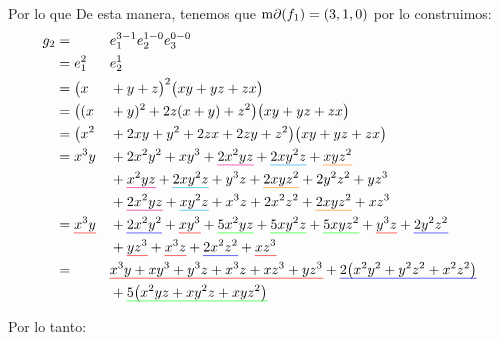 \begin{solucion}
    Por lo que
De esta manera, tenemos que $\operatorname{m\partial}(f_{1})=(3,1,0)$ por lo construimos:
\begin{alignat*}{2}
    g_2 &=&&e_1^{3-1}e_2^{1-0}e_3^{0-0}\\
        &=e_1^{2}&&e_2^1\\
        &=\bigl(x&&+y+z\bigr)^2\bigl(xy +yz+zx\bigr)\\
        &=\bigl((x&&+y)^2 + 2z(x+y) + z^2\bigr)\bigl(xy +yz+zx\bigr)\\
        &=\bigl(x^2 &&+ 2xy + y^2 + 2zx + 2zy + z^2\bigr)\bigl(xy +yz+zx\bigr)\\
        &=x^{3}y
          &&+2x^{2}y^{2}
          +xy^{3}
          +\text{\setulcolor{magenta}\ul{$2x^{2}yz$}}
          +\text{\setulcolor{cyan}\ul{$2xy^{2}z$}}
          +\text{\setulcolor{orange}\ul{$xyz^{2}$}}\\
            & &&
          +\text{\setulcolor{magenta}\ul{$x^{2}yz$}}
          +\text{\setulcolor{cyan}\ul{$2xy^{2}z$}}
          +y^{3}z
          +\text{\setulcolor{orange}\ul{$2xyz^{2}$}}
          +2y^{2}z^{2}
          +yz^{3}\\
            & &&
          +\text{\setulcolor{magenta}\ul{$2x^{2}yz$}}
          +\text{\setulcolor{cyan}\ul{$xy^{2}z$}}
          +x^{3}z
          +2x^{2}z^{2}
          +\text{\setulcolor{orange}\ul{$2xyz^{2}$}}
          +xz^{3}\\
        &=
          \text{\setulcolor{red}\ul{$x^{3}y$}}
          &&+\text{\setulcolor{blue}\ul{$2x^{2}y^{2}$}}
          +\text{\setulcolor{red}\ul{$xy^{3}$}}
          +\text{\setulcolor{green}\ul{$5x^{2}yz$}}
          +\text{\setulcolor{green}\ul{$5xy^{2}z$}}
          +\text{\setulcolor{green}\ul{$5xyz^{2}$}}
          +\text{\setulcolor{red}\ul{$y^{3}z$}}
          +\text{\setulcolor{blue}\ul{$2y^{2}z^{2}$}}\\
          & &&+\text{\setulcolor{red}\ul{$yz^{3}$}}
          +\text{\setulcolor{red}\ul{$x^3z$}}
          +\text{\setulcolor{blue}\ul{$2x^2z^2$}}
          +\text{\setulcolor{red}\ul{$xz^{3}$}}\\
        &=&&\text{\setulcolor{red}\ul{$x^{3}y+ xy^{3} + y^{3}z + x^{3}z + xz^{3} + yz^{3}$}}
        +\text{\setulcolor{blue}\ul{$2\bigl(x^{2}y^{2} + y^{2}z^{2}+x^{2}z^{2}\bigr)$}}\\
        & &&+\text{\setulcolor{green}\ul{$5\bigl(x^{2}yz + xy^{2}z + xyz^{2}\bigr)$}}
    \end{alignat*}

    Por lo tanto:


\end{solucion}

